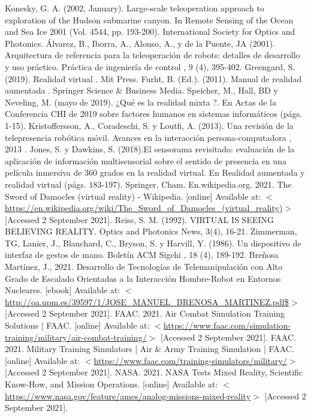 \begin{thebibliography}{2}
	 Konesky, G. A. (2002, January). Large-scale teleoperation approach to exploration of the Hudson submarine canyon. In Remote Sensing of the Ocean and Sea Ice 2001 (Vol. 4544, pp. 193-200). International Society for Optics and Photonics.
	 Álvarez, B., Iborra, A., Alonso, A., y de la Puente, JA (2001). Arquitectura de referencia para la teleoperación de robots: detalles de desarrollo y uso práctico. Práctica de ingeniería de control , 9 (4), 395-402.
	 Greengard, S. (2019). Realidad virtual . Mit Press.
	 Furht, B. (Ed.). (2011). Manual de realidad aumentada . Springer Science \& Business Media.
	 Speicher, M., Hall, BD y Neveling, M. (mayo de 2019). ¿Qué es la realidad mixta ?. En Actas de la Conferencia CHI de 2019 sobre factores humanos en sistemas informáticos (págs. 1-15).
	 Kristoffersson, A., Coradeschi, S. y Loutfi, A. (2013). Una revisión de la telepresencia robótica móvil. Avances en la interacción persona-computadora , 2013 .
	 Jones, S. y Dawkins, S. (2018).El sensorama revisitado: evaluación de la aplicación de información multisensorial sobre el sentido de presencia en una película inmersiva de 360 grados en la realidad virtual. En Realidad aumentada y realidad virtual (págs. 183-197). Springer, Cham.
	 En.wikipedia.org. 2021. The Sword of Damocles (virtual reality) - Wikipedia. [online] Available at: $<$\url{https://en.wikipedia.org/wiki/The\_Sword\_of\_Damocles\_(virtual\_reality)}$>$ [Accessed 2 September 2021].
	 Reiss, S. M. (1992). VIRTUAL IS SEEING BELIEVING REALITY. Optics and Photonics News, 3(4), 16-21.
	 Zimmerman, TG, Lanier, J., Blanchard, C., Bryson, S. y Harvill, Y. (1986). Un dispositivo de interfaz de gestos de mano. Boletín ACM Sigchi , 18 (4), 189-192.
	 Breñosa Martínez, J., 2021. Desarrollo de Tecnologías de Telemanipulación con Alto Grado de Escalado Orientadas a la Interacción Hombre-Robot en Entornos Nucleares. [ebook] Available at: $<$\url{http://oa.upm.es/39597/1/JOSE\_MANUEL\_BRENOSA\_MARTINEZ.pdf$}$>$ [Accessed 2 September 2021].
	 FAAC. 2021. Air Combat Simulation Training Solutions | FAAC. [online] Available at: $<$\url{https://www.faac.com/simulation-training/military/air-combat-training/}$>$ [Accessed 2 September 2021].
	 FAAC. 2021. Military Training Simulators | Air \& Army Training Simulation | FAAC. [online] Available at: $<$\url{https://www.faac.com/training-simulators/military/}$>$ [Accessed 2 September 2021].
	 NASA. 2021. NASA Tests Mixed Reality, Scientific Know-How, and Mission Operations. [online] Available at: $<$\url{https://www.nasa.gov/feature/ames/analog-missions-mixed-reality}$>$ [Accessed 2 September 2021].

\end{thebibliography}

